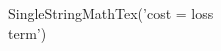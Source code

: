 \documentclass[preview]{standalone}
\begin{document}
\begin{center}
SingleStringMathTex('cost = loss\\ term')
\end{center}
\end{document}
